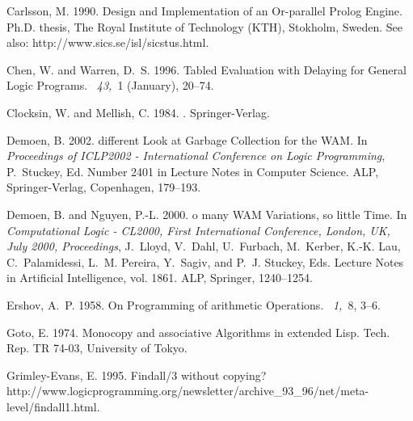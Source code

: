 \documentclass{tlp}
\begin{document}
\begin{thebibliography}{}
{\sc Carlsson, M.} 1990.
\newblock Design and {I}mplementation of an {O}r-parallel {P}rolog {E}ngine.
\newblock Ph.D. thesis, The Royal Institute of Technology (KTH), Stokholm,
  Sweden. See also: {\sf http://www.sics.se/isl/sicstus.html}.

{\sc Chen, W.} {\sc and} {\sc Warren, D.~S.} 1996.
\newblock Tabled {E}valuation with {D}elaying for {G}eneral {L}ogic {P}rograms.
~{\em 43,\/}~1 (January), 20--74.

{\sc Clocksin, W.} {\sc and} {\sc Mellish, C.} 1984.
.
\newblock Springer-Verlag.

{\sc Demoen, B.} 2002.
 different {L}ook at {G}arbage {C}ollection for the {WAM}.
\newblock In {\em Proceedings of ICLP2002 - International Conference on Logic
  Programming}, {P.~Stuckey}, Ed. Number 2401 in Lecture Notes in Computer
  Science. ALP, Springer-Verlag, Copenhagen, 179--193.

{\sc Demoen, B.} {\sc and} {\sc Nguyen, P.-L.} 2000.
o many {WAM} {V}ariations, so little {T}ime.
\newblock In {\em Computational Logic - CL2000, First International Conference,
  London, UK, July 2000, Proceedings}, {J.~Lloyd}, {V.~Dahl}, {U.~Furbach},
  {M.~Kerber}, {K.-K. Lau}, {C.~Palamidessi}, {L.~M. Pereira}, {Y.~Sagiv},
  {and} {P.~J. Stuckey}, Eds. Lecture Notes in Artificial Intelligence, vol.
  1861. ALP, Springer, 1240--1254.

{\sc Ershov, A.~P.} 1958.
\newblock On {P}rogramming of arithmetic {O}perations.
~{\em 1,\/}~8, 3--6.

{\sc Goto, E.} 1974.
\newblock Monocopy and associative {A}lgorithms in extended {L}isp.
\newblock Tech. Rep. TR 74-03, University of Tokyo.

{\sc Grimley-Evans, E.} 1995.
\newblock Findall/3 without copying?
\newblock
  http://www.logicprogramming.org/newsletter/archive\_93\_96/net/meta-level/findall1.html.


\end{thebibliography}
\end{document}
